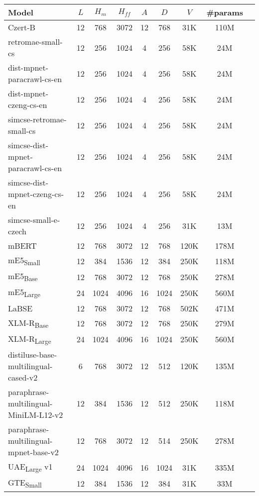 \begin{table*}[ht!]
    \centering
    \begin{tabular}{lcccccccc}
      \toprule
      \textbf{Model} & $L$ & $H_m$ & $H_{ff}$ & $A$ & $D$ & $V$ & \textbf{\#params} \\
      \midrule
      Czert-B & 12 & 768 & 3072 & 12 & 768 & 31K & 110M \\
      retromae-small-cs & 12 & 256 & 1024 & 4 & 256 & 58K & 24M \\
      dist-mpnet-paracrawl-cs-en & 12 & 256 & 1024 & 4 & 256 & 58K & 24M \\
      dist-mpnet-czeng-cs-en & 12 & 256 & 1024 & 4 & 256 & 58K & 24M \\
      simcse-retromae-small-cs & 12 & 256 & 1024 & 4 & 256 & 58K & 24M \\
      simcse-dist-mpnet-paracrawl-cs-en & 12 & 256 & 1024 & 4 & 256 & 58K & 24M \\
      simcse-dist-mpnet-czeng-cs-en & 12 & 256 & 1024 & 4 & 256 & 58K & 24M \\
      simcse-small-e-czech & 12 & 256 & 1024 & 4 & 256 & 31K & 13M \\
      mBERT & 12 & 768 & 3072 & 12 & 768 & 120K & 178M \\
      mE5\textsubscript{Small} & 12 & 384 & 1536 & 12 & 384 & 250K & 118M \\
      mE5\textsubscript{Base} & 12 & 768 & 3072 & 12 & 768 & 250K & 278M \\
      mE5\textsubscript{Large} & 24 & 1024 & 4096 & 16 & 1024 & 250K & 560M \\
      LaBSE & 12 & 768 & 3072 & 12 & 768 & 502K & 471M \\
      XLM-R\textsubscript{Base} & 12 & 768 & 3072 & 12 & 768 & 250K & 279M \\
      XLM-R\textsubscript{Large} & 24 & 1024 & 4096 & 16 & 1024 & 250K & 560M \\
      distiluse-base-multilingual-cased-v2 & 6 & 768 & 3072 & 12 & 512 & 120K & 135M \\
      paraphrase-multilingual-MiniLM-L12-v2 & 12 & 384 & 1536 & 12 & 512 & 250K & 118M \\
      paraphrase-multilingual-mpnet-base-v2 & 12 & 768 & 3072 & 12 & 514 & 250K & 278M \\
      UAE\textsubscript{Large} v1 & 24 & 1024 & 4096 & 16 & 1024 & 31K & 335M \\
      GTE\textsubscript{Small} & 12 & 384 & 1536 & 12 & 384 & 31K & 33M \\

\end{tabular}
\end{table*}
